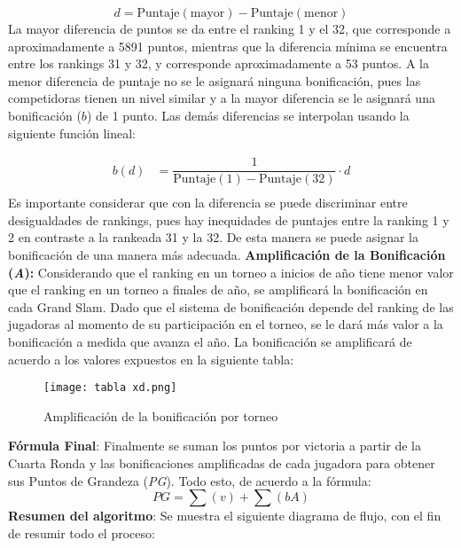 \documentclass[a4paper]{article}
\begin{document}
\begin{equation*}
    d = \text{Puntaje}(\text{mayor})-\text{Puntaje}(\text{menor})
\end{equation*}
La mayor diferencia de puntos se da entre el ranking 1 y el 32, que corresponde a aproximadamente a 5891 puntos, mientras que la diferencia mínima se encuentra entre los rankings 31 y 32, y corresponde aproximadamente a 53 puntos. A la menor diferencia de puntaje no se le asignará ninguna bonificación, pues las competidoras tienen un nivel similar y a la mayor diferencia se le asignará una bonificación ($b$) de 1 punto. Las demás diferencias se interpolan usando la siguiente función lineal:

\begin{align*}
    b(d)&= \dfrac{1}{\text{Puntaje}(1)-\text{Puntaje}(32)}\cdot d\\
\end{align*}
Es importante considerar que con la diferencia se puede discriminar entre desigualdades de rankings, pues hay inequidades de puntajes entre la ranking 1 y 2 en contraste a la rankeada 31 y la 32. De esta manera se puede asignar la bonificación de una manera más adecuada. \newline \newline \textbf{Amplificación de la Bonificación (\textit{A}):}
Considerando que el ranking en un torneo a inicios de año tiene menor valor que el ranking en un torneo a finales de año, se amplificará la bonificación en cada Grand Slam. Dado que el sistema de bonificación depende del ranking de las jugadoras al momento de su participación en el torneo, se le dará más valor a la bonificación a medida que avanza el año. La bonificación se amplificará de acuerdo a los valores expuestos en la siguiente tabla: \newline 
\begin{figure}[H]
    \begin{center}
    \texttt{[image: tabla xd.png]}    
    \end{center}    
    \caption{Amplificación de la bonificación por torneo}
\end{figure}

\textbf{Fórmula Final}: Finalmente se suman los puntos por victoria a partir de la Cuarta Ronda y las bonificaciones amplificadas de cada jugadora para obtener sus Puntos de Grandeza (\textit{PG}). Todo esto, de acuerdo a la fórmula:
 \newline 
 \begin{equation*}
     PG = \sum(v) + \sum(bA)
 \end{equation*}
 \textbf{Resumen del algoritmo}: Se muestra el siguiente diagrama de flujo, con el fin de resumir todo el proceso:
 
\end{document}
